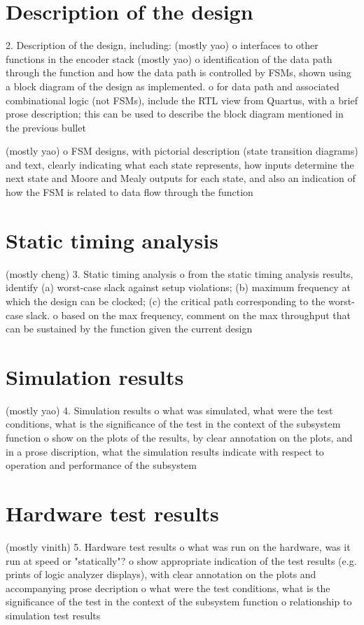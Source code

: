 \documentclass[letterpaper]{article} %
\begin{document}
\section{Description of the design}
    2.  Description of the design, including:
        (mostly yao)
         o  interfaces to other functions in the encoder stack
        (mostly yao)
         o  identification of the data path through the function and
		    how the data path is controlled by FSMs, shown using a
			block diagram of the design as implemented. 
         o  for data path and associated combinational logic (not FSMs), include
            the RTL view from Quartus, with a brief prose description;  this can
            be used to describe the block diagram mentioned in the
			previous bullet

		(mostly yao)
         o  FSM designs, with pictorial description (state transition diagrams)
            and text, clearly indicating what each state
            represents, how inputs determine the next state and Moore and Mealy
            outputs for each state, and also an indication of how the FSM is
            related to data flow through the function
\section{Static timing analysis}
(mostly cheng)
    3.  Static timing analysis
		 o  from the static timing analysis results, identify (a) worst-case slack
		 	against setup violations;  (b) maximum frequency at which the design
			can be clocked;  (c) the critical path corresponding to the worst-case
			slack.
		 o	based on the max frequency, comment on the max throughput that can
		 	be sustained by the function given the current design
\section{Simulation results}
(mostly yao)
	4.  Simulation results
         o  what was simulated, what were the test conditions, what is the
            significance of the test in the context of the subsystem function
         o  show on the plots of the results, by clear annotation on the plots,
            and in a prose discription, what the simulation results indicate with
            respect to operation and performance of the subsystem

\section{Hardware test results}
(mostly vinith)
    5.  Hardware test results
         o  what was run on the hardware, was it run at speed or "statically"?
         o  show appropriate indication of the test results (e.g. prints of
            logic analyzer displays), with clear annotation on the plots and
            accompanying prose decription
         o  what were the test conditions, what is the significance of the test
            in the context of the subsystem function
         o  relationship to simulation test results
\end{document}

